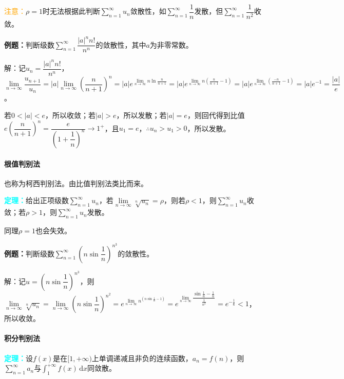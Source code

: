 \textcolor{orange}{注意：}$\rho=1$时无法根据此判断$\sum\limits_{n=1}^\infty u_n$敛散性，如$\sum\limits_{n=1}^\infty\dfrac{1}{n}$发散，但$\sum\limits_{n=1}^\infty\dfrac{1}{n^2}$收敛。

\textbf{例题：}判断级数$\sum\limits_{n=1}^\infty\dfrac{\vert a\vert^nn!}{n^n}$的敛散性，其中$a$为非零常数。

解：记$u_n=\dfrac{\vert a\vert^nn!}{n^n}$，$\lim\limits_{n\to\infty}\dfrac{u_{n+1}}{u_n}=\vert a\vert\lim\limits_{n\to\infty}\left(\dfrac{n}{n+1}\right)^n=\vert a\vert e^{\lim\limits_{n\to\infty}n\ln\frac{n}{n+1}}=\vert a\vert e^{\lim\limits_{n\to\infty}n(\frac{n}{n+1}-1)}=\vert a\vert e^{\lim\limits_{n\to\infty}(\frac{-n}{n+1}-1)}=\vert a\vert e^{-1}=\dfrac{\vert a\vert}{e}$。

若$0<\vert a\vert<e$，所以收敛；若$\vert a\vert>e$，所以发散；若$\vert a\vert=e$，则回代得到比值$e\left(\dfrac{n}{n+1}\right)^n=\dfrac{e}{(1+\dfrac{1}{n})^n}\to1^+$，且$u_1=e$，$\therefore u_n>u_1>0$，所以发散。

\paragraph{根值判别法} \leavevmode \medskip

也称为柯西判别法。由比值判别法类比而来。

\textcolor{aqua}{\textbf{定理：}}给出正项级数$\sum\limits_{n=1}^\infty u_n$，若$\lim\limits_{n\to\infty}\sqrt[n]{u_n}=\rho$，则若$\rho<1$，则$\sum\limits_{n=1}^\infty u_n$收敛；若$\rho>1$，则$\sum\limits_{n=1}^\infty u_n$发散。

同理$\rho=1$也会失效。

\textbf{例题：}判断级数$\sum\limits_{n=1}^\infty\left(n\sin\dfrac{1}{n}\right)^{n^3}$的敛散性。

解：记$u=\left(n\sin\dfrac{1}{n}\right)^{n^3}$，则$\lim\limits_{n\to\infty}\sqrt[n]{u_n}=\lim\limits_{n\to\infty}\left(n\sin\dfrac{1}{n}\right)^{n^2}=e^{\lim\limits_{n\to\infty}n^(n\sin\frac{1}{n}-1)}=e^{\lim\limits_{n\to\infty}\dfrac{\sin\frac{1}{n}-\frac{1}{n}}{\frac{1}{n^3}}}=e^{-\frac{1}{6}}<1$，所以收敛。

\paragraph{积分判别法} \leavevmode \medskip

\textcolor{aqua}{\textbf{定理：}}设$f(x)$是在$[1,+\infty)$上单调递减且非负的连续函数，$a_n=f(n)$，则$\sum\limits_{n=1}^\infty a_n$与$\int_1^{+\infty}f(x)\,\textrm{d}x$同敛散。

